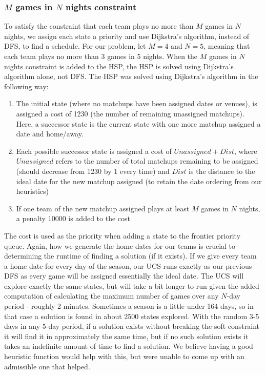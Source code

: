 \documentclass{article}
\begin{document}
	\subsubsection{$M$ games in $N$ nights constraint}
	To satisfy the constraint that each team plays no more than $M$ games in $N$ nights, we assign each state a priority and use Dijkstra's algorithm, instead of DFS, to find a schedule. For our problem, let $M=4$ and $N=5$, meaning that each team plays no more than 3 games in 5 nights.  When the $M$ games in $N$ nights constraint is added to the HSP, the HSP is solved using Dijkstra's algorithm alone, not DFS.
    The HSP was solved using Dijkstra's algorithm in the following way:
    \begin{enumerate}
    	\item The initial state (where no matchups have been assigned dates or venues), is assigned a cost of 1230 (the number of remaining unassigned matchups).  Here, a successor state is the current state with one more matchup assigned a date and home/away.
    	\item Each possible successor state is assigned a cost of $Unassigned + Dist$, where $Unassigned$ refers to the number of total matchups remaining to be assigned (should decrease from 1230 by 1 every time) and $Dist$ is the distance to the ideal date for the new matchup assigned (to retain the date ordering from our heuristics)
    	\item If one team of the new matchup assigned plays at least $M$ games in $N$ nights, a penalty 10000 is added to the cost
    \end{enumerate}
    The cost is used as the priority when adding a state to the frontier priority queue. Again, how we generate the home dates for our teams is crucial to determining the runtime of finding a solution (if it exists). If we give every team a home date for every day of the season, our UCS runs exactly as our previous DFS as every game will be assigned essentially the ideal date. The UCS will explore exactly the same states, but will take a bit longer to run given the added computation of calculating the maximum number of games over any $N$-day period - roughly 2 minutes. Sometimes a season is a little under 164 days, so in that case a solution is found in about 2500 states explored. With the random 3-5 days in any 5-day period, if a solution exists without breaking the soft constraint it will find it in approximately the same time, but if no such solution exists it takes an indefinite amount of time to find a solution. We believe having a good heuristic function would help with this, but were unable to come up with an admissible one that helped.
\end{document}
